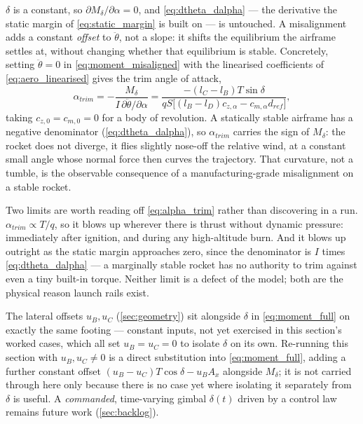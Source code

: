 $\delta$ is a constant, so $\partial M_\delta/\partial\alpha=0$, and \autoref{eq:dtheta_dalpha} ---
the derivative the static margin of \autoref{eq:static_margin} is built on --- is untouched. A
misalignment adds a constant \emph{offset} to $\ddot{\theta}$, not a slope: it shifts the
equilibrium the airframe settles at, without changing whether that equilibrium is stable.
Concretely, setting $\ddot{\theta}=0$ in \autoref{eq:moment_misaligned} with the linearised
coefficients of \autoref{eq:aero_linearised} gives the trim angle of attack,
\begin{equation} \label{eq:alpha_trim}
    \alpha_{trim} = -\frac{M_\delta}{I\,\partial\ddot{\theta}/\partial\alpha}
        = \frac{-(l_C - l_B)T\sin\delta}
               {qS\bigl[(l_B - l_D)c_{z,\alpha} - c_{m,\alpha}d_{ref}\bigr]},
\end{equation}
taking $c_{z,0}=c_{m,0}=0$ for a body of revolution. A statically stable airframe has a negative
denominator (\autoref{eq:dtheta_dalpha}), so $\alpha_{trim}$ carries the sign of $M_\delta$: the
rocket does not diverge, it flies slightly nose-off the relative wind, at a constant small angle
whose normal force then curves the trajectory. That curvature, not a tumble, is the observable
consequence of a manufacturing-grade misalignment on a stable rocket.

Two limits are worth reading off \autoref{eq:alpha_trim} rather than discovering in a run.
$\alpha_{trim}\propto T/q$, so it blows up wherever there is thrust without dynamic pressure:
immediately after ignition, and during any high-altitude burn. And it blows up outright as the
static margin approaches zero, since the denominator is $I$ times \autoref{eq:dtheta_dalpha} --- a
marginally stable rocket has no authority to trim against even a tiny built-in torque. Neither
limit is a defect of the model; both are the physical reason launch rails exist.

The lateral offsets $u_B,u_C$ (\autoref{sec:geometry}) sit alongside $\delta$ in
\autoref{eq:moment_full} on exactly the same footing --- constant inputs, not yet exercised in
this section's worked cases, which all set $u_B=u_C=0$ to isolate $\delta$ on its own. Re-running
this section with $u_B,u_C\neq0$ is a direct substitution into \autoref{eq:moment_full}, adding a
further constant offset $(u_B-u_C)T\cos\delta-u_BA_x$ alongside $M_\delta$; it is not carried
through here only because there is no case yet where isolating it separately from $\delta$ is
useful. A \emph{commanded}, time-varying gimbal $\delta(t)$ driven by a control law remains future
work (\autoref{sec:backlog}).

